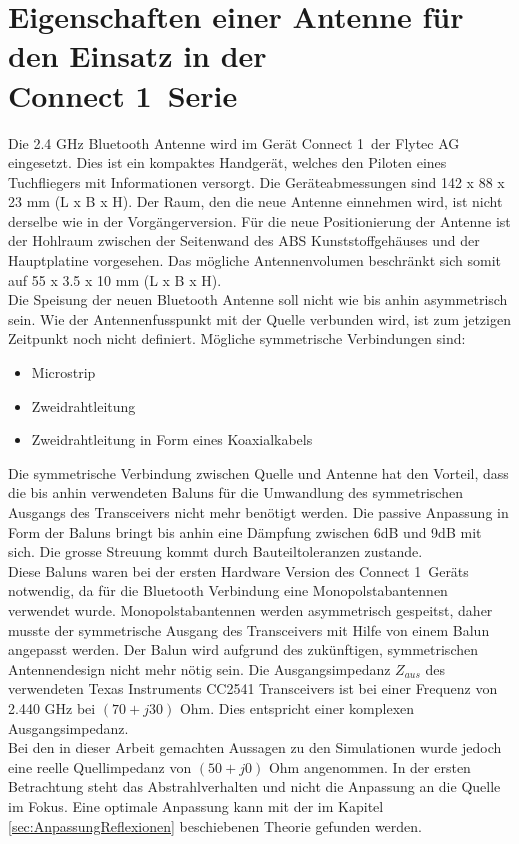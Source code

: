 \section{Eigenschaften einer Antenne für den Einsatz in der \\ \glqq Connect 1\grqq \ Serie}\label{sec:EigenschaftenAntenne}
Die 2.4 GHz Bluetooth Antenne wird im Gerät \glqq Connect 1\grqq \ der Flytec AG eingesetzt. Dies ist ein kompaktes Handgerät, welches den Piloten eines Tuchfliegers mit Informationen versorgt. Die Geräteabmessungen sind 142 x 88 x 23 mm (L x B x H). Der Raum, den die neue Antenne einnehmen wird, ist nicht derselbe wie in der Vorgängerversion. Für die neue Positionierung der Antenne ist der Hohlraum zwischen der Seitenwand des ABS Kunststoffgehäuses und der Hauptplatine vorgesehen. Das mögliche Antennenvolumen beschränkt sich somit auf 55 x 3.5 x 10 mm (L x B x H).\\
Die Speisung der neuen Bluetooth Antenne soll nicht wie bis anhin asymmetrisch sein. Wie der Antennenfusspunkt mit der Quelle verbunden wird, ist zum jetzigen Zeitpunkt noch nicht definiert. Mögliche symmetrische Verbindungen sind:
\begin{itemize}
\item Microstrip 
\item Zweidrahtleitung
\item Zweidrahtleitung in Form eines Koaxialkabels
\end{itemize}
Die symmetrische Verbindung zwischen Quelle und Antenne hat den Vorteil, dass die bis anhin verwendeten Baluns für die Umwandlung des symmetrischen Ausgangs des Transceivers nicht mehr benötigt werden. Die passive Anpassung in Form der Baluns bringt bis anhin eine Dämpfung zwischen 6dB und 9dB mit sich. Die grosse Streuung kommt durch Bauteiltoleranzen zustande.\\
Diese Baluns waren bei der ersten Hardware Version des \glqq Connect 1\grqq \ Geräts notwendig, da für die Bluetooth Verbindung eine Monopolstabantennen verwendet wurde. Monopolstabantennen werden asymmetrisch gespeitst, daher musste der symmetrische Ausgang des Transceivers mit Hilfe von einem Balun angepasst werden. Der Balun wird aufgrund des zukünftigen, symmetrischen Antennendesign nicht mehr nötig sein. Die Ausgangsimpedanz $Z_{aus}$ des verwendeten Texas Instruments CC2541 Transceivers ist bei einer Frequenz von 2.440 GHz bei $(70+j30)$ Ohm. Dies entspricht einer komplexen Ausgangsimpedanz. \\
Bei den in dieser Arbeit gemachten Aussagen zu den Simulationen wurde jedoch eine reelle Quellimpedanz von $(50+j0)$ Ohm angenommen. In der ersten Betrachtung steht das Abstrahlverhalten und nicht die Anpassung an die Quelle im Fokus. Eine optimale Anpassung kann mit der im Kapitel \ref{sec:AnpassungReflexionen} beschiebenen Theorie gefunden werden.\\

